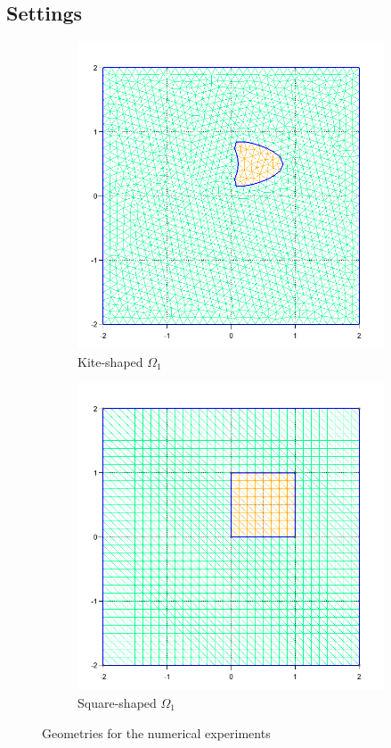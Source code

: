 \documentclass{article}
\theoremstyle{remark}
\begin{document}
\subsection{Settings}
\begin{figure}
    \centering
    \begin{subfigure}{0.49\textwidth}
        \centering
        \includegraphics[width=\textwidth]{kite_sq.png}
        \caption{Kite-shaped $\Omega_1$}
    \end{subfigure}
    \begin{subfigure}{0.49\textwidth}
        \centering
        \includegraphics[width=\textwidth]{square_sq.png}
        \caption{Square-shaped $\Omega_1$}
    \end{subfigure}
    \caption{Geometries for the numerical experiments}
    \label{fig:geo}
\end{figure}
\end{document}

